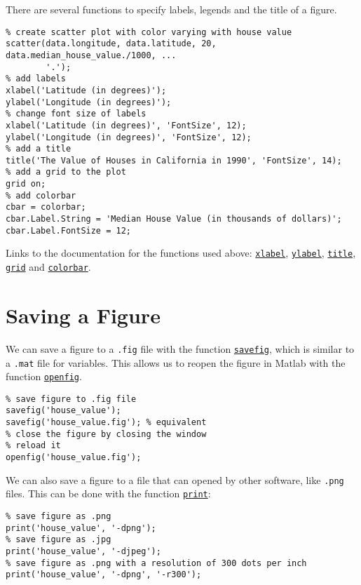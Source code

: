 \documentclass[12pt, a4paper]{article}
\begin{document}
There are several functions to specify labels, legends and the title of a figure.
\lstset{language=matlab,label= ,caption= ,captionpos=b,firstnumber=1,numbers=left,style=Matlab-editor}
\begin{lstlisting}
% create scatter plot with color varying with house value
scatter(data.longitude, data.latitude, 20, data.median_house_value./1000, ...
        '.');
% add labels
xlabel('Latitude (in degrees)');
ylabel('Longitude (in degrees)');
% change font size of labels
xlabel('Latitude (in degrees)', 'FontSize', 12);
ylabel('Longitude (in degrees)', 'FontSize', 12);
% add a title
title('The Value of Houses in California in 1990', 'FontSize', 14);
% add a grid to the plot
grid on;
% add colorbar
cbar = colorbar;
cbar.Label.String = 'Median House Value (in thousands of dollars)';
cbar.Label.FontSize = 12;
\end{lstlisting}
Links to the documentation for the functions used above: \href{https://www.mathworks.com/help/matlab/ref/xlabel.html}{\texttt{xlabel}}, \href{https://www.mathworks.com/help/matlab/ref/ylabel.html}{\texttt{ylabel}}, \href{https://www.mathworks.com/help/matlab/ref/title.html?s\_tid=doc\_ta}{\texttt{title}}, \href{https://www.mathworks.com/help/matlab/ref/grid.html}{\texttt{grid}} and \href{https://www.mathworks.com/help/matlab/ref/colorbar.html}{\texttt{colorbar}}.
\section{Saving a Figure}
\label{sec:org8e097f0}
We can save a figure to a \texttt{.fig} file with the function \href{https://www.mathworks.com/help/matlab/ref/savefig.html?s\_tid=doc\_ta}{\texttt{savefig}}, which is similar to a \texttt{.mat} file for variables.
This allows us to reopen the figure in Matlab with the function \href{https://www.mathworks.com/help/matlab/ref/openfig.html}{\texttt{openfig}}.
\lstset{language=matlab,label= ,caption= ,captionpos=b,firstnumber=1,numbers=left,style=Matlab-editor}
\begin{lstlisting}
% save figure to .fig file
savefig('house_value');
savefig('house_value.fig'); % equivalent
% close the figure by closing the window
% reload it
openfig('house_value.fig');
\end{lstlisting}
We can also save a figure to a file that can opened by other software, like \texttt{.png} files.
This can be done with the function \href{https://www.mathworks.com/help/matlab/ref/print.html}{\texttt{print}}:
\lstset{language=matlab,label= ,caption= ,captionpos=b,firstnumber=1,numbers=left,style=Matlab-editor}
\begin{lstlisting}
% save figure as .png
print('house_value', '-dpng');
% save figure as .jpg
print('house_value', '-djpeg');
% save figure as .png with a resolution of 300 dots per inch
print('house_value', '-dpng', '-r300');
\end{lstlisting}
\end{document}
